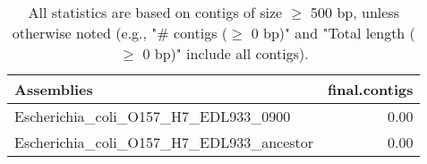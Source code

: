 \documentclass[12pt,a4paper]{article}
\begin{document}
\begin{table}[ht]
\begin{center}
\caption{All statistics are based on contigs of size $\geq$ 500 bp, unless otherwise noted (e.g., "\# contigs ($\geq$ 0 bp)" and "Total length ($\geq$ 0 bp)" include all contigs).}
\begin{tabular}{|l*{1}{|r}|}
\hline
Assemblies & final.contigs \\ \hline
Escherichia\_coli\_O157\_H7\_EDL933\_0900 & 0.00 \\ \hline
Escherichia\_coli\_O157\_H7\_EDL933\_ancestor & 0.00 \\ \hline
\end{tabular}
\end{center}
\end{table}
\end{document}
